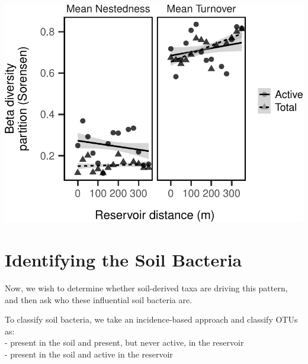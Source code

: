 \documentclass[]{article}
\begin{document}
\begin{center}\includegraphics{ReservoirGradient_files/figure-latex/unnamed-chunk-3-2} \end{center}

\hypertarget{identifying-the-soil-bacteria}{%
\section{Identifying the Soil
Bacteria}\label{identifying-the-soil-bacteria}}

Now, we wish to determine whether soil-derived taxa are driving this
pattern, and then ask who these influential soil bacteria are.

To classify soil bacteria, we take an incidence-based approach and
classify OTUs as:\\
- present in the soil and present, but never active, in the reservoir\\
- present in the soil and active in the reservoir
\end{document}
